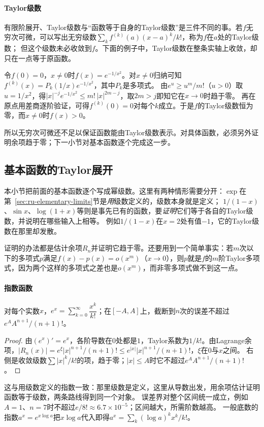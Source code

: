 \paragraph{Taylor级数}
有限阶展开、Taylor级数与“函数等于自身的Taylor级数”是三件不同的事。若$f$无穷次可微，可以写出无穷级数$\sum_kf^{(k)}(a)(x-a)^k/k!$，称为$f$在$a$处的Taylor级数；
但这个级数未必收敛到$f$。下面的例子中，Taylor级数在整条实轴上收敛，却只在一点等于原函数。
\begin{example}[光滑但不等于自身Taylor级数的函数]
\label{ex:ru-smooth-not-analytic}
令$f(0)=0$，$x\neq0$时$f(x)=e^{-1/x^2}$。对$x\neq0$归纳可知$f^{(k)}(x)=P_k(1/x)e^{-1/x^2}$，其中$P_k$是多项式。
由$e^u\geq u^m/m!$（$u>0$）取$u=1/x^2$，得$|x|^{-j}e^{-1/x^2}\leq m!\,|x|^{2m-j}$，取$2m>j$即知它在$x\to0$时趋于零。
再在原点用差商逐阶验证，可得$f^{(k)}(0)=0$对每个$k$成立。于是$f$的Taylor级数恒为零，而$x\neq0$时$f(x)>0$。
\end{example}
所以无穷次可微还不足以保证函数能由Taylor级数表示。对具体函数，必须另外证明余项趋于零；下一小节对基本函数逐个完成这一步。

\subsection{基本函数的Taylor展开}
\label{sec:ru-elementary-taylor}
\label{sec:ru-exp-expansion}

本小节把前面的基本函数逐个写成幂级数。这里有两种情形需要分开：$\exp$在第~\ref{sec:ru-elementary-limits}节是\emph{用}级数定义的，级数本身就是定义；
$1/(1-x)$、$\sin x$、$\log(1+x)$等则是事先已有的函数，要\emph{证明}它们等于各自的Taylor级数，并说明在哪些输入上相等。
例如$1/(1-x)$在$x=2$处有值$-1$，它的Taylor级数在那里却发散。

证明的办法都是估计余项$R_n$并证明它趋于零。还要用到一个简单事实：若$m$次以下的多项式$p$满足$f(x)-p(x)=o(x^m)$（$x\to0$），则$p$就是$f$的$m$阶Taylor多项式，因为两个这样的多项式之差也是$o(x^m)$，而非零多项式做不到这一点。

\paragraph{指数函数}
\begin{theorem}[指数函数的展开]
\label{thm:ru-exp-series}
对每个实数$x$，$e^x=\sum_{k=0}^\infty\dfrac{x^k}{k!}$；在$[-A,A]$上，截断到$n$次的误差不超过$e^AA^{n+1}/(n+1)!$。
\end{theorem}
\begin{proof}
由$(e^x)'=e^x$，各阶导数在$0$处都是$1$，Taylor系数为$1/k!$。由Lagrange余项，$|R_n(x)|=e^\xi|x|^{n+1}/(n+1)!\leq e^{|x|}|x|^{n+1}/(n+1)!$，$\xi$在$0$与$x$之间。
右侧是收敛级数$\sum|x|^k/k!$的项，趋于零；$|x|\leq A$时它不超过$e^AA^{n+1}/(n+1)!$。
\end{proof}
这与用级数定义的指数一致：那里级数是定义，这里从导数出发，用余项估计证明函数等于级数，两条路线得到同一个对象。
误差界对整个区间统一成立，例如$A=1$、$n=7$时不超过$e/8!\approx6.7\times10^{-5}$；区间越大，所需阶数越高。
一般底数的指数$a^x=e^{x\log a}$把$x\log a$代入即得$a^x=\sum_k(\log a)^kx^k/k!$。

